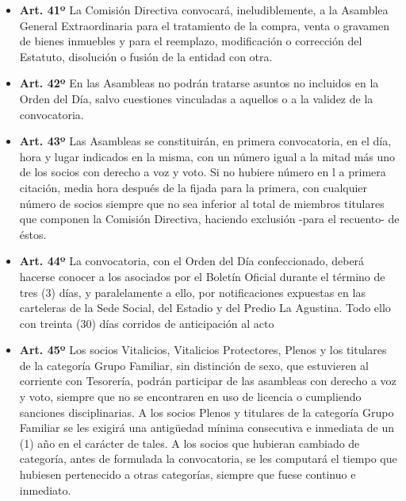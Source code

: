 \documentclass[]{book}
\providecommand{\tightlist}{%
  \setlength{\itemsep}{0pt}\setlength{\parskip}{0pt}}
\begin{document}
\begin{itemize}
\tightlist
\item
  \textbf{Art. 41º} La Comisión Directiva convocará, ineludiblemente, a
  la Asamblea General Extraordinaria para el tratamiento de la compra,
  venta o gravamen de bienes inmuebles y para el reemplazo, modificación
  o corrección del Estatuto, disolución o fusión de la entidad con otra.
\end{itemize}

\begin{itemize}
\tightlist
\item
  \textbf{Art. 42º} En las Asambleas no podrán tratarse asuntos no
  incluidos en la Orden del Día, salvo cuestiones vinculadas a aquellos
  o a la validez de la convocatoria.
\end{itemize}

\begin{itemize}
\tightlist
\item
  \textbf{Art. 43º} Las Asambleas se constituirán, en primera
  convocatoria, en el día, hora y lugar indicados en la misma, con un
  número igual a la mitad más uno de los socios con derecho a voz y
  voto. Si no hubiere número en l a primera citación, media hora después
  de la fijada para la primera, con cualquier número de socios siempre
  que no sea inferior al total de miembros titulares que componen la
  Comisión Directiva, haciendo exclusión -para el recuento- de éstos.
\end{itemize}

\begin{itemize}
\tightlist
\item
  \textbf{Art. 44º} La convocatoria, con el Orden del Día confeccionado,
  deberá hacerse conocer a los asociados por el Boletín Oficial durante
  el término de tres (3) días, y paralelamente a ello, por
  notificaciones expuestas en las carteleras de la Sede Social, del
  Estadio y del Predio La Agustina. Todo ello con treinta (30) días
  corridos de anticipación al acto
\end{itemize}

\begin{itemize}
\tightlist
\item
  \textbf{Art. 45º} Los socios Vitalicios, Vitalicios Protectores,
  Plenos y los titulares de la categoría Grupo Familiar, sin distinción
  de sexo, que estuvieren al corriente con Tesorería, podrán participar
  de las asambleas con derecho a voz y voto, siempre que no se
  encontraren en uso de licencia o cumpliendo sanciones disciplinarias.
  A los socios Plenos y titulares de la categoría Grupo Familiar se les
  exigirá una antigüedad mínima consecutiva e inmediata de un (1) año en
  el carácter de tales. A los socios que hubieran cambiado de categoría,
  antes de formulada la convocatoria, se les computará el tiempo que
  hubiesen pertenecido a otras categorías, siempre que fuese continuo e
  inmediato.
\end{itemize}
\end{document}
